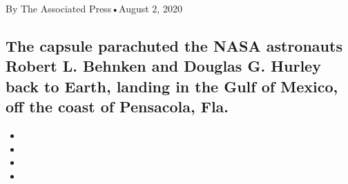 By The Associated Press•August 2, 2020

\hypertarget{the-capsule-parachuted-the-nasa-astronauts-robert-l-behnken-and-douglas-g-hurley-back-to-earth-landing-in-the-gulf-of-mexico-off-the-coast-of-pensacola-fla-1}{%
\subsection{The capsule parachuted the NASA astronauts Robert L. Behnken
and Douglas G. Hurley back to Earth, landing in the Gulf of Mexico, off
the coast of Pensacola,
Fla.}\label{the-capsule-parachuted-the-nasa-astronauts-robert-l-behnken-and-douglas-g-hurley-back-to-earth-landing-in-the-gulf-of-mexico-off-the-coast-of-pensacola-fla-1}}

\begin{itemize}
\item
\item
\item
\item
\end{itemize}

